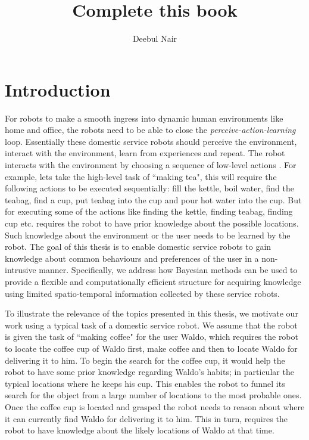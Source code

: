 \documentclass[11pt]{book}
\title{\textbf{Complete this book }}
\author{Deebul Nair}
\date{}
\begin{document}
\chapter{Introduction}


For robots to make a smooth ingress into dynamic human environments like home and office, the robots need to be able to close the \emph{perceive-action-learning} loop. Essentially these domestic service robots should perceive the environment, interact with the environment, learn from experiences and repeat. The robot interacts with the environment by choosing a sequence of low-level actions . For example, lets take the high-level task of ``making tea", this will require the following actions to be executed sequentially: fill the kettle, boil water, find the teabag, find a cup, put teabag into the cup and pour hot water into the cup. But for executing some of the actions like finding the kettle, finding teabag, finding cup etc. requires the robot to have prior knowledge about the possible locations. Such knowledge about the environment or the user needs to be learned by the robot. The goal of this thesis is to enable domestic service robots to gain knowledge about common behaviours and preferences of the user in a non-intrusive manner. Specifically, we address how Bayesian methods can be used to provide a flexible and computationally efficient structure for acquiring knowledge using limited spatio-temporal information collected by these service robots.


To illustrate the relevance of the topics presented in this thesis, we motivate our work using a typical task of a domestic service robot.   We assume that the robot is given the task of ``making coffee" for the user Waldo, which requires the robot to locate the coffee cup of Waldo first, make coffee and then to locate Waldo for delivering it to him. To begin the search for the coffee cup, it would help the robot to have some prior knowledge regarding Waldo's habits; in particular the typical locations where he keeps his cup. This enables the robot to funnel its search for the object from a large number of locations to the most probable ones. Once the coffee cup is located and grasped the robot needs to reason about where it can currently find Waldo for delivering it to him. This in turn, requires the robot to have knowledge about the likely locations of Waldo at that time.
\end{document}
